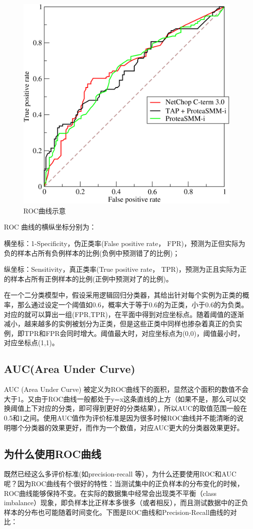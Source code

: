 \documentclass[12pt]{article}
\begin{document}
\begin{figure}[ht]
  \centering
  \includegraphics[width=.5\textwidth]{fig/ROC_example.png} %
  \caption{ROC曲线示意} %
  \label{ROC_example} %
\end{figure}

ROC 曲线的横纵坐标分别为：

横坐标：1-Specificity，伪正类率(False positive rate， FPR)，预测为正但实际为负的样本占所有负例样本的比例(负例中预测错了的比例)；

纵坐标：Sensitivity，真正类率(True positive rate， TPR)，预测为正且实际为正的样本占所有正例样本的比例(正例中预测对了的比例)。

在一个二分类模型中，假设采用逻辑回归分类器，其给出针对每个实例为正类的概率，那么通过设定一个阈值如0.6，概率大于等于0.6的为正类，小于0.6的为负类。对应的就可以算出一组(FPR,TPR)，在平面中得到对应坐标点。随着阈值的逐渐减小，越来越多的实例被划分为正类，但是这些正类中同样也掺杂着真正的负实例，即TPR和FPR会同时增大。阈值最大时，对应坐标点为(0,0)，阈值最小时，对应坐标点(1,1)。

\subsection{AUC(Area Under Curve)}
AUC (Area Under Curve) 被定义为ROC曲线下的面积，显然这个面积的数值不会大于1。又由于ROC曲线一般都处于y=x这条直线的上方（如果不是，那么可以交换阈值上下对应的分类，即可得到更好的分类结果），所以AUC的取值范围一般在0.5和1之间。使用AUC值作为评价标准是因为很多时候ROC曲线并不能清晰的说明哪个分类器的效果更好，而作为一个数值，对应AUC更大的分类器效果更好。

\subsection{为什么使用ROC曲线}
既然已经这么多评价标准(如precision-recall 等），为什么还要使用ROC和AUC呢？因为ROC曲线有个很好的特性：当测试集中的正负样本的分布变化的时候，ROC曲线能够保持不变。在实际的数据集中经常会出现类不平衡（class imbalance）现象，即负样本比正样本多很多（或者相反），而且测试数据中的正负样本的分布也可能随着时间变化。下图是ROC曲线和Precision-Recall曲线的对比：
\end{document}
